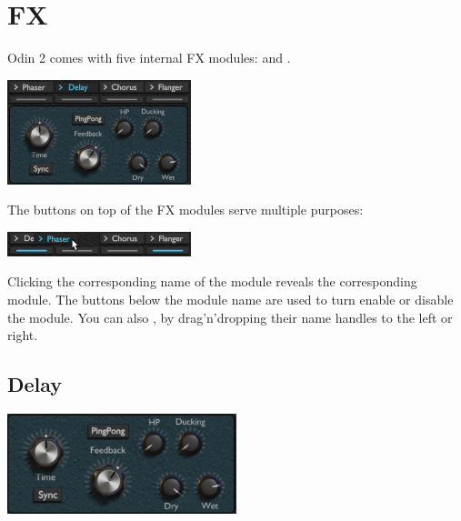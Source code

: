 \chapter{FX}
\label{FX}
Odin 2 comes with five internal FX modules:  and .

\begin{center}
    \includegraphics[width=0.4\textwidth]{graphics/FX.png}
\end{center}

The buttons on top of the FX modules serve multiple purposes:

\begin{center}
    \includegraphics[width=0.4\textwidth]{graphics/FX_selector.png}
\end{center}

Clicking the corresponding name of the module reveals the corresponding module. The buttons below the module name are used to turn enable or disable the module.
You can also , by drag'n'dropping their name handles to the left or right.



\section{Delay}
\label{delay}
\begin{center}
    \includegraphics[width=0.5\textwidth]{graphics/delay.png}
\end{center}

